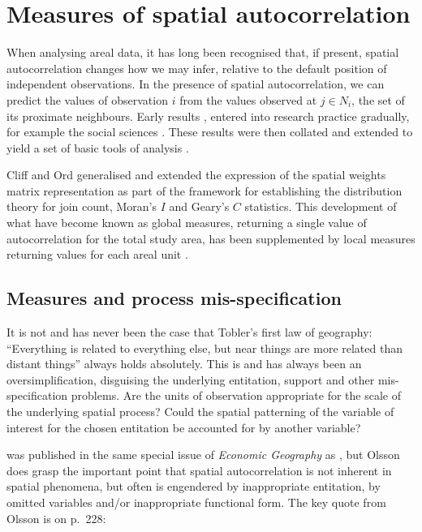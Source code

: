 \documentclass[]{book}
\begin{document}
\hypertarget{spatautocorr}{%
\chapter{Measures of spatial autocorrelation}\label{spatautocorr}}

When analysing areal data, it has long been recognised that, if present, spatial autocorrelation changes how we may infer, relative to the default position of independent observations. In the presence of spatial autocorrelation, we can predict the values of observation \(i\) from the values observed at \(j \in N_i\), the set of its proximate neighbours. Early results \citep{moran48, geary:54}, entered into research practice gradually, for example the social sciences \citep{duncanetal61}. These results were then collated and extended to yield a set of basic tools of analysis \citep{cliff+ord:73, cliff+ord:81}.

Cliff and Ord \citeyearpar{cliff+ord:73} generalised and extended the expression of the spatial weights matrix representation as part of the framework for establishing the distribution theory for join count, Moran's \(I\) and Geary's \(C\) statistics. This development of what have become known as global measures, returning a single value of autocorrelation for the total study area, has been supplemented by local measures returning values for each areal unit \citep{getis+ord:92, anselin:95}.

\hypertarget{measures-and-process-mis-specification}{%
\section{Measures and process mis-specification}\label{measures-and-process-mis-specification}}

It is not and has never been the case that Tobler's first law of geography: ``Everything is related to everything else, but near things are more related than distant things'' always holds absolutely. This is and has always been an oversimplification, disguising the underlying entitation, support and other mis-specification problems. Are the units of observation appropriate for the scale of the underlying spatial process? Could the spatial patterning of the variable of interest for the chosen entitation be accounted for by another variable?

\citet{10.2307/143141} was published in the same special issue of \emph{Economic Geography} as \citet{10.2307/143140}, but Olsson does grasp the important point that spatial autocorrelation is not inherent in spatial phenomena, but often is engendered by inappropriate entitation, by omitted variables and/or inappropriate functional form. The key quote from Olsson is on p.~228:
\end{document}

